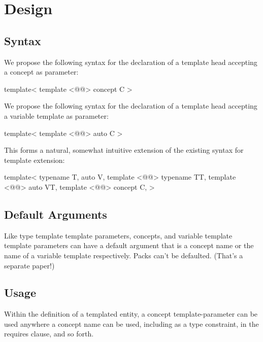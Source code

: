 \documentclass{wg21}
\begin{document}
\section{Design}

\subsection{Syntax}

We propose the following syntax for the declaration of a template head accepting a concept as parameter:

\begin{colorblock}
template<
    template <@@> concept C
>
\end{colorblock}

We propose the following syntax for the declaration of a template head accepting a variable template as parameter:

\begin{colorblock}
template<
    template <@@> auto C
>
\end{colorblock}

This forms a natural, somewhat intuitive extension of the existing syntax for template extension:
\begin{colorblock}
template<
    typename T,
    auto V,
    template <@@> typename TT,
    template <@@> auto VT,
    template <@@> concept C,
>
\end{colorblock}

\subsection{Default Arguments}

Like type template template parameters, concepts, and variable template template
parameters can have a default argument that is a concept name or the name of a variable template respectively.
Packs can't be defaulted. (That's a separate paper!)

\subsection{Usage}

Within the definition of a templated entity, a concept template-parameter
can be used anywhere a concept name can be used, including as a type constraint, in the requires clause, and so forth.
\end{document}
